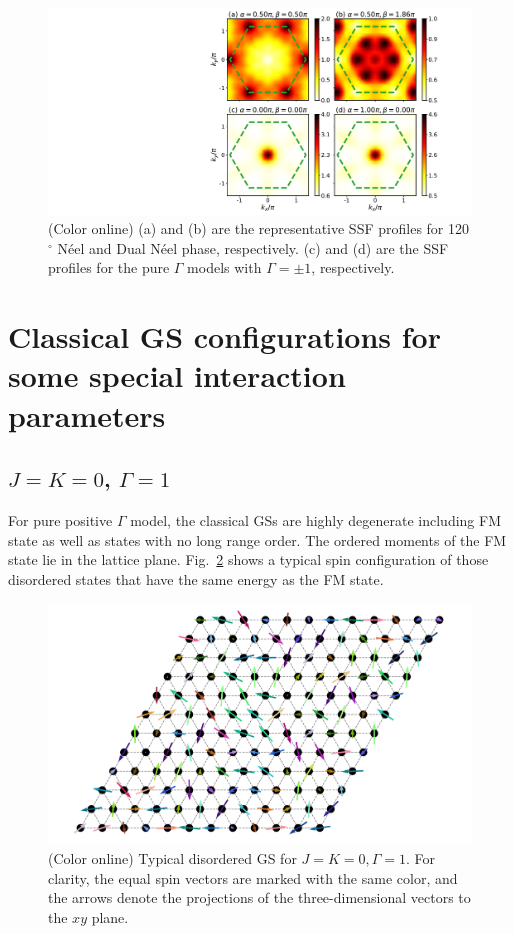 \documentclass[aps,prb,reprint,amsfonts,amsmath,amssymb,showpacs,groupedaddress,superscriptaddress]{revtex4-1}
\begin{document}
\begin{figure}
    \centering
    \includegraphics[width=\columnwidth]{fig/AppendixSSF.pdf}
    \caption{\label{fig:AppendixSSF}(Color online) (a) and (b) are the representative SSF profiles for 120$^\circ$ N\'{e}el and Dual N\'{e}el phase, respectively. (c) and (d) are the SSF profiles for the pure $\Gamma$ models with $\Gamma = \pm 1$, respectively.}
\end{figure}

\section{\label{apx:DegeneratedStates}Classical GS configurations for some special interaction parameters}

\subsection{$J=K=0$, $\Gamma=1$}

For pure positive $\Gamma$ model, the classical GSs are highly degenerate including FM state as well as states with no long range order. The ordered moments of the FM state lie in the lattice plane. Fig.~\ref{fig:GSForPositiveGamma} shows a typical spin configuration of those disordered states that have the same energy as the FM state.

\begin{figure}
    \centering
    \includegraphics[width=\columnwidth]{fig/SpinConfigForPositiveGamma.pdf}
    \caption{\label{fig:GSForPositiveGamma}(Color online) Typical disordered GS for $J=K=0, \Gamma=1$. For clarity, the equal spin vectors are marked with the same color, and the arrows denote the projections of the three-dimensional vectors to the $xy$ plane.}
\end{figure}
\end{document}
